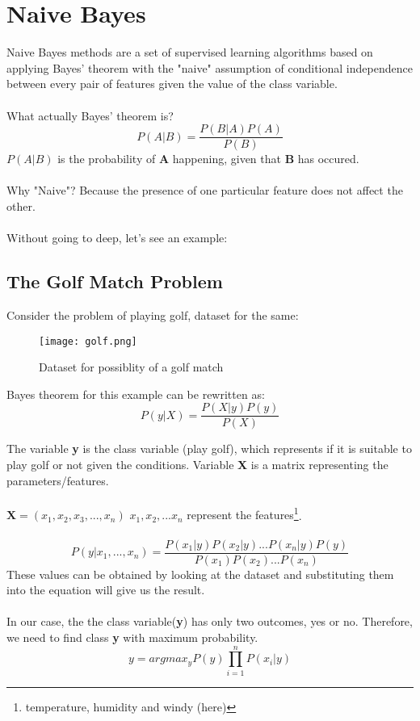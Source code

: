 \section*{Naive Bayes}

Naive Bayes methods are a set of supervised learning algorithms based on applying Bayes' theorem with the "naive" assumption of conditional independence between every pair of features given the value of the class variable.\\ \\
What actually Bayes' theorem is?
\begin{equation}\label {eq:bayes}
    P(A|B) = \frac{P(B|A)P(A)}{P(B)}
\end{equation}
$P(A|B)$ is the probability of \textbf{A} happening, given that \textbf{B} has occured.\\ \\ Why "Naive"? Because the presence of one particular feature does not affect the other.
\\ \\ 
Without going to deep, let's see an example:

\subsection*{The Golf Match Problem}
    Consider the problem of playing golf, dataset for the same:
    \begin{figure}[h]
        \centering
        \texttt{[image: golf.png]}
        \caption{Dataset for possiblity of a golf match}
    \end{figure}

    Bayes theorem for this example can be rewritten as:
    \begin{equation}
        P(y|X) = \frac{P(X|y)P(y)}{P(X)}
    \end{equation}

    The variable \textbf{y} is the class variable (play golf), which represents if it is suitable to play golf or not given the conditions. Variable \textbf{X} is a matrix representing the parameters/features.
    \\ \\
    $\textbf{X} = (x_1, x_2, x_3, ... , x_n)$ \hfill    \small{$x_1, x_2, ... x_n$ represent the features}\footnote[1]{temperature, humidity and windy (here)}.
    \\ \\

    \begin{equation}
        P(y|x_1, ..., x_n) = \frac{P(x_1|y)P(x_2|y)...P(x_n|y)P(y)}{P(x_1)P(x_2)...P(x_n)}
    \end{equation}
    These values can be obtained by looking at the dataset and substituting them into the equation will give us the result.
    \\ \\
    In our case, the the class variable(\textbf{y}) has only two outcomes, yes or no. Therefore, we need to find class \textbf{y} with maximum probability. 
    \begin{equation}
        y = argmax_yP(y)\prod_{i=1}^{n}P(x_i|y)
    \end{equation}

